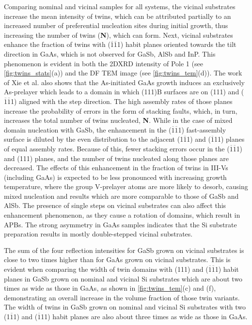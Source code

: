 Comparing nominal and vicinal samples for all systems, the vicinal substrates increase the mean intensity of twins, which can be attributed partially to an increased number of preferential nucleation sites during initial growth, thus increasing the number of twins (\textbf{N}), which can form.
Next, vicinal substrates enhance the fraction of twins with
(\(\overline{1}\overline{1}\)1)
habit planes oriented towards the tilt direction in GaAs, which is not observed for GaSb, AlSb and InP\@. This phenomenon is evident in both the 2DXRD intensity of Pole 1 (see \cref{fig:twins_stats}(a)) and the DF TEM image (see \cref{fig:twins_tem}(d)).
The work of Xie et al.
also shows that the As-initiated GaAs growth induces an exclusively As-prelayer which leads to a domain in which (111)B surfaces are on (111) and
(\(\overline{1}\overline{1}\)1)
aligned with the step direction.
The high assembly rates of those planes increase the probability of errors in the form of stacking faults, which, in turn, increases the total number of twins nucleated, \textbf{N}.
While in the case of mixed domain nucleation with GaSb, the enhancement in the
(\(\overline{1}\overline{1}\)1)
fast-assembly surface is diluted by the even distribution to the adjacent (1\(\overline{1}\)1) and (\(\overline{1}\)11) planes of equal assembly rates.
Because of this, fewer stacking errors occur in the
(\(\overline{1}\overline{1}\)1)
and (111) planes, and the number of twins nucleated along those planes are decreased.
The effects of this enhancement in the fraction of twins in III-Vs (including GaAs) is expected to be less pronounced with increasing growth temperature, where the group V-prelayer atoms are more likely to desorb, causing mixed nucleation and results which are more comparable to those of GaSb and AlSb.
The presence of single steps on vicinal substrates can also affect this enhancement phenomenon, as they cause a rotation of domains, which result in APBs.
The strong asymmetry in GaAs samples indicates that the Si substrate preparation results in mostly double-stepped vicinal substrates.

The sum of the four reflection intensities for GaSb grown on vicinal substrates is close to two times higher than for GaAs grown on vicinal substrates.
This is evident when comparing the width of twin domains with (111) and
(\(\overline{1}\overline{1}\)1)
habit planes in GaSb grown on nominal and vicinal Si substrates which are about two times as wide as those in GaAs, as shown in \cref{fig:twins_tem}(c) and (f), demonstrating an overall increase in the volume fraction of those twin variants.
The width of twins in GaSb grown on nominal and vicinal Si substrates with two (1\(\overline{1}\)1) and (\(\overline{1}\)11) habit planes are also about three times as wide as those in GaAs.

